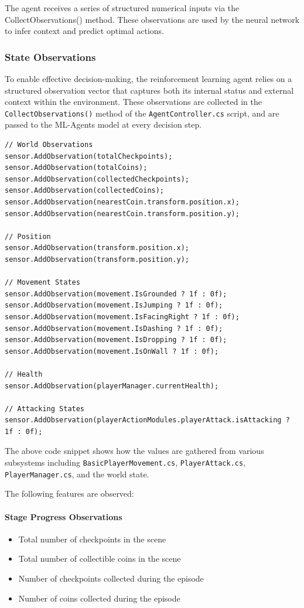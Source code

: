 \documentclass[12pt,oneside,openright,a4paper]{cpe-english-project}
\begin{document}
The agent receives a series of structured numerical inputs via the CollectObservations() method. These observations are used by the neural network to infer context and predict optimal actions.

\subsubsection{State Observations}

To enable effective decision-making, the reinforcement learning agent relies on a structured observation vector that captures both its internal status and external context within the environment. These observations are collected in the \texttt{CollectObservations()} method of the \texttt{AgentController.cs} script, and are passed to the ML-Agents model at every decision step.
\begin{lstlisting}[language={[Sharp]C}]
// World Observations
sensor.AddObservation(totalCheckpoints);
sensor.AddObservation(totalCoins);
sensor.AddObservation(collectedCheckpoints);
sensor.AddObservation(collectedCoins);
sensor.AddObservation(nearestCoin.transform.position.x);
sensor.AddObservation(nearestCoin.transform.position.y);

// Position
sensor.AddObservation(transform.position.x);
sensor.AddObservation(transform.position.y);

// Movement States
sensor.AddObservation(movement.IsGrounded ? 1f : 0f);
sensor.AddObservation(movement.IsJumping ? 1f : 0f);
sensor.AddObservation(movement.IsFacingRight ? 1f : 0f);
sensor.AddObservation(movement.IsDashing ? 1f : 0f);
sensor.AddObservation(movement.IsDropping ? 1f : 0f);
sensor.AddObservation(movement.IsOnWall ? 1f : 0f);

// Health
sensor.AddObservation(playerManager.currentHealth);

// Attacking States
sensor.AddObservation(playerActionModules.playerAttack.isAttacking ? 1f : 0f);
\end{lstlisting}
The above code snippet shows how the values are gathered from various subsystems including \texttt{BasicPlayerMovement.cs}, \texttt{PlayerAttack.cs}, \texttt{PlayerManager.cs}, and the world state.\par
The following features are observed:

\paragraph{Stage Progress Observations}
\begin{itemize}
\item Total number of checkpoints in the scene
\item Total number of collectible coins in the scene
\item Number of checkpoints collected during the episode
\item Number of coins collected during the episode
\end{itemize}
\end{document}
